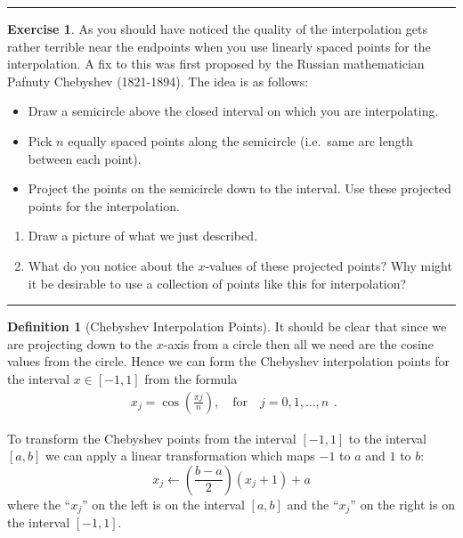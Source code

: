 \documentclass[
]{book}
\providecommand{\tightlist}{%
  \setlength{\itemsep}{0pt}\setlength{\parskip}{0pt}}
\theoremstyle{definition}
\newtheorem{definition}{Definition}[chapter]
\theoremstyle{definition}
\theoremstyle{definition}
\newtheorem{exercise}{Exercise}[chapter]
\theoremstyle{remark}
\begin{document}
\begin{center}\rule{0.5\linewidth}{0.5pt}\end{center}

\begin{exercise}
\protect\hypertarget{exr:unnamed-chunk-850}{}{\label{exr:unnamed-chunk-850} }As you should have noticed the quality of the interpolation gets rather
terrible near the endpoints when you use linearly spaced points for the
interpolation. A fix to this was first proposed by the Russian
mathematician Pafnuty Chebyshev (1821-1894). The idea is as follows:

\begin{itemize}
\item
  Draw a semicircle above the closed interval on which you are
  interpolating.
\item
  Pick \(n\) equally spaced points along the semicircle (i.e.~same arc
  length between each point).
\item
  Project the points on the semicircle down to the interval. Use these
  projected points for the interpolation.
\end{itemize}

\begin{enumerate}
\def\labelenumi{\alph{enumi}.}
\tightlist
\item
  Draw a picture of what we just described.
\item
  What do you notice about the \(x\)-values of these projected points? Why might it be desirable to use a collection of points like this for interpolation?
\end{enumerate}
\end{exercise}

\begin{center}\rule{0.5\linewidth}{0.5pt}\end{center}

\begin{definition}[Chebyshev Interpolation Points]
\protect\hypertarget{def:unnamed-chunk-851}{}{\label{def:unnamed-chunk-851} {} }It should be clear that since we are projecting down to the \(x\)-axis from a circle then all we need are the cosine values from the circle. Hence we can form the Chebyshev interpolation points for the interval \(x \in [-1,1]\) from the formula
\[\begin{aligned}
    x_j = \cos\left( \frac{\pi j}{n} \right), \quad \text{for} \quad j=0, 1, \ldots, n
    \label{eqn:chebyshev_cosine}\end{aligned}.\]

To transform the Chebyshev points from the interval \([-1,1]\) to the interval \([a,b]\) we can apply a linear transformation which maps \(-1\) to \(a\) and \(1\) to \(b\):
\[x_j \gets \left( \frac{b-a}{2} \right)\left( x_j + 1 \right) + a\]
where the ``\(x_j\)'' on the left is on the interval \([a,b]\) and the ``\(x_j\)''
on the right is on the interval \([-1,1]\).
\end{definition}
\end{document}
